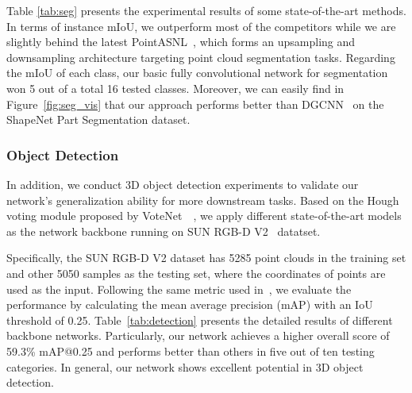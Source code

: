 \documentclass[journal,twoside]{IEEEtran}
\begin{document}
Table \ref{tab:seg} presents the experimental results of some state-of-the-art methods. In terms of instance mIoU, we outperform most of the competitors while we are slightly behind the latest PointASNL~\cite{Yan_2020_CVPR}, which forms an upsampling and downsampling architecture targeting point cloud segmentation tasks. Regarding the mIoU of each class, our basic fully convolutional network for segmentation won 5 out of a total 16 tested classes. Moreover, we can easily find in Figure~\ref{fig:seg_vis} that our approach performs better than DGCNN~\cite{wang2019dynamic} on the ShapeNet Part Segmentation dataset.

\subsubsection{Object Detection}
In addition, we conduct 3D object detection experiments to validate our network's generalization ability for more downstream tasks. Based on the Hough voting module proposed by VoteNet~~\cite{qi2019deep}, we apply different state-of-the-art models as the network backbone running on SUN RGB-D V2~\cite{song2015sun} datatset.

Specifically, the SUN RGB-D V2 dataset has 5285 point clouds in the training set and other 5050 samples as the testing set, where the coordinates of points are used as the input. Following the same metric used in~\cite{qi2019deep, song2015sun}, we evaluate the performance by calculating the mean average precision (mAP) with an IoU threshold of 0.25. Table~\ref{tab:detection} presents the detailed results of different backbone networks. Particularly, our network achieves a higher overall score of 59.3\% mAP@0.25 and performs better than others in five out of ten testing categories. In general, our network shows excellent potential in 3D object detection.
\end{document}

